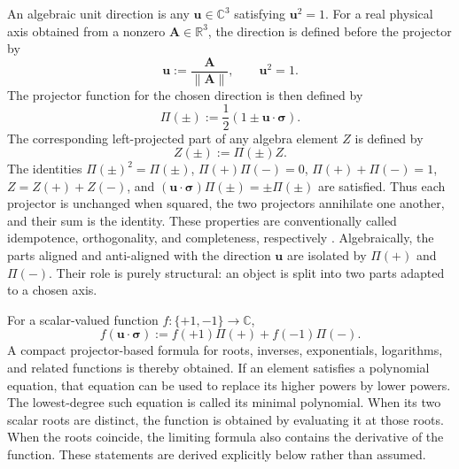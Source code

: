 \documentclass[10pt,letterpaper]{article}
\newcommand{\R}{\mathbb{R}}
\newcommand{\C}{\mathbb{C}}
\newcommand{\pv}[1]{#1}
\newcommand{\vct}[1]{\mathbf{#1}}
\newcommand{\sigv}{\vct{\pv{\bm{\sigma}}}}
\begin{document}
An algebraic unit direction is any \(\vct{u}\in\C^3\) satisfying
\(\vct{u}^2=1\). For a real physical axis obtained from a nonzero
\(\vct{A}\in\R^3\), the direction is defined before the projector by
\begin{equation}
\vct{u}:=\frac{\vct{A}}{\|\vct{A}\|},
\qquad
\vct{u}^2=1.
\label{eq:real-unit-axis}
\end{equation}
The projector function for the chosen direction is then defined by
\begin{equation}
\pv{\Pi}(\pm):=\frac{1}{2}(1\pm \vct{u}\cdot\sigv).
\label{eq:projectors}
\end{equation}
The corresponding left-projected part of any algebra element \(\pv{Z}\) is
defined by
\begin{equation}
\pv{Z}(\pm):=\pv{\Pi}(\pm)\pv{Z}.
\label{eq:projected-part-function}
\end{equation}
The identities \(\pv{\Pi}(\pm)^2=\pv{\Pi}(\pm)\),
\(\pv{\Pi}(+)\pv{\Pi}(-)=0\), \(\pv{\Pi}(+)+\pv{\Pi}(-)=1\),
\(\pv{Z}=\pv{Z}(+)+\pv{Z}(-)\), and
\((\vct{u}\cdot\sigv)\pv{\Pi}(\pm)=\pm\pv{\Pi}(\pm)\) are satisfied.
Thus each projector is unchanged when squared, the two projectors annihilate
one another, and their sum is the identity. These properties are
conventionally called idempotence, orthogonality, and completeness,
respectively \cite{sakurai2017}.
Algebraically, the parts aligned and anti-aligned with the direction \(\vct{u}\) are isolated by \(\pv{\Pi}(+)\) and \(\pv{\Pi}(-)\). Their role is purely structural: an object is split into two parts adapted to a chosen axis.

For a scalar-valued function \(f:\{+1,-1\}\to\C\),
\begin{equation}
f(\vct{u}\cdot\sigv):=f(+1)\pv{\Pi}(+)+f(-1)\pv{\Pi}(-).
\label{eq:functional-calculus}
\end{equation}
A compact projector-based formula for roots, inverses, exponentials,
logarithms, and related functions is thereby obtained. If an element satisfies
a polynomial equation, that equation can be used to replace its higher powers
by lower powers. The lowest-degree such equation is called its minimal
polynomial. When its two scalar roots are distinct, the function is obtained
by evaluating it at those roots. When the roots coincide, the limiting formula
also contains the derivative of the function. These statements are derived
explicitly below rather than assumed.
\end{document}
